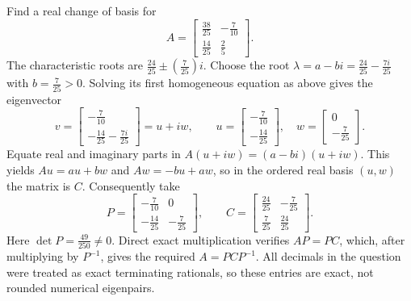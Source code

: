 \goal Find a real change of basis for
\[A=\begin{bmatrix}\frac{38}{25}&- \frac{7}{10}\\\frac{14}{25}&\frac{2}{5}\end{bmatrix}.\]
The characteristic roots are $\frac{24}{25}\pm(\frac{7}{25})i$. Choose the root $\lambda=a-bi=\frac{24}{25} - \frac{7 i}{25}$ with $b=\frac{7}{25}>0$. Solving its first homogeneous equation as above gives the eigenvector
\[v=\begin{bmatrix}- \frac{7}{10}\\- \frac{14}{25} - \frac{7 i}{25}\end{bmatrix}=u+iw,\qquad u=\begin{bmatrix}- \frac{7}{10}\\- \frac{14}{25}\end{bmatrix},\quad w=\begin{bmatrix}0\\- \frac{7}{25}\end{bmatrix}.\]
Equate real and imaginary parts in $A(u+iw)=(a-bi)(u+iw)$. This yields $Au=au+bw$ and $Aw=-bu+aw$, so in the ordered real basis $(u,w)$ the matrix is $C$. Consequently take
\[P=\begin{bmatrix}- \frac{7}{10}&0\\- \frac{14}{25}&- \frac{7}{25}\end{bmatrix},\qquad C=\begin{bmatrix}\frac{24}{25}&- \frac{7}{25}\\\frac{7}{25}&\frac{24}{25}\end{bmatrix}.\]
Here $\det P=\frac{49}{250}\ne0$. Direct exact multiplication verifies $AP=PC$, which, after multiplying by $P^{-1}$, gives the required $A=PCP^{-1}$.
All decimals in the question were treated as exact terminating rationals, so these entries are exact, not rounded numerical eigenpairs.

